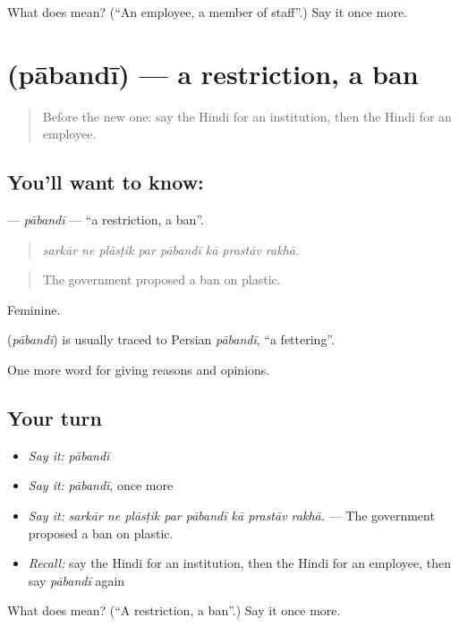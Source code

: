 \begin{tcolorbox}[breakable,colback=teal!4,colframe=teal!35!black,title={Before you move on}]
What does  mean? (\textquotedblleft{}An employee, a member of staff\textquotedblright{}.) Say it once more.
\end{tcolorbox}
\section[\texorpdfstring{\hi{पाबंदी} (pābandī)}{पाबंदी (pābandī)}]{ (pābandī) — a restriction, a ban}

\label{lesson:HI-C369-pabandi}



\begin{quote}
Before the new one: say the Hindi for an institution, then the Hindi for an employee.
\end{quote}

\subsection*{You'll want to know: }
\textbf{} — \emph{pābandī} — \textquotedblleft{}a restriction, a ban\textquotedblright{}.

\begin{quote}
       
\end{quote}

\begin{quote}
\emph{sarkār ne plāsṭik par pābandī kā prastāv rakhā.}
\end{quote}

\begin{quote}
The government proposed a ban on plastic.
\end{quote}

Feminine.

\begin{cousinweb}
\textbf{} (\emph{pābandī}) is usually traced to Persian \emph{pābandī}, \textquotedblleft{}a fettering\textquotedblright{}.
\end{cousinweb}

\begin{grammarlens}[title={What you've built}]
One more word for giving reasons and opinions.
\end{grammarlens}

\subsection*{Your turn}
\begin{itemize}
\raggedright
  \item \emph{Say it:} \emph{pābandī}
  \item \emph{Say it:} \emph{pābandī}, once more
  \item \emph{Say it:} \emph{sarkār ne plāsṭik par pābandī kā prastāv rakhā.} — The government proposed a ban on plastic.
  \item \emph{Recall:} say the Hindi for an institution, then the Hindi for an employee, then say \emph{pābandī} again
\end{itemize}

\begin{tcolorbox}[breakable,colback=teal!4,colframe=teal!35!black,title={Before you move on}]
What does  mean? (\textquotedblleft{}A restriction, a ban\textquotedblright{}.) Say it once more.
\end{tcolorbox}
